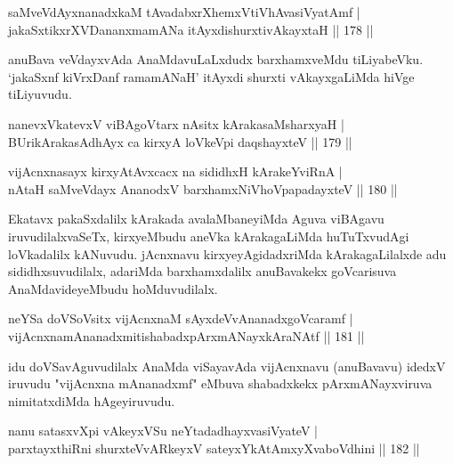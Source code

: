 \begin{shl}
saMveVdAyxnanadxkaM tAvadabxrXhemxVtiVhAvasiVyatAmf |\\
jakaSxtikxrXVDananxmamANa itAyxdishurxtivAkayxtaH \hfill || 178 ||
\end{shl}

\begin{artha}
anuBava veVdayxvAda AnaMdavuLaLxdudx barxhamxveMdu tiLiyabeVku. `jakaSxnf kiVrxDanf ramamANaH' itAyxdi shurxti vAkayxgaLiMda hiVge tiLiyuvudu.
\end{artha}


\begin{shl}
nanevxVkatevxV viBAgoV\s tarx nAsitx kArakasaMsharxyaH |\\
BUrikArakasAdhAyx ca kirxyA loVkeV\s pi daqshayxteV \hfill || 179 ||
\end{shl}

\begin{shl}
vijAcnxnasayx kirxyAtAvxcacx na sididhxH kArakeYviRnA |\\
nAtaH saMveVdayx AnanodxV barxhamxNiVhoVpapadayxteV \hfill || 180 ||
\end{shl}

\begin{artha}%
Ekatavx pakaSxdalilx kArakada avalaMbaneyiMda Aguva viBAgavu iruvudilalxvaSeTx, kirxyeMbudu aneVka kArakagaLiMda huTuTxvudAgi loVkadalilx kANuvudu. jAcnxnavu kirxyeyAgidadxriMda kArakagaLilalxde adu sididhxsuvudilalx, adariMda barxhamxdalilx anuBavakekx goVcarisuva AnaMdavideyeMbudu hoMduvudilalx.
\end{artha}


\begin{shl}
neYSa doVSoV\s sitx vijAcnxnaM sAyxdeVvA\s \s nanadxgoVcaramf |\\
vijAcnxnamAnanadxmitishabadxpArxmANayxkAraNAtf \hfill || 181 ||
\end{shl}

\begin{artha}
idu doVSavAguvudilalx AnaMda viSayavAda vijAcnxnavu (anuBavavu) idedxV iruvudu "vijAcnxna mAnanadxmf" eMbuva shabadxkekx pArxmANayxviruva nimitatxdiMda hAgeyiruvudu.
\end{artha}


\begin{shl}
nanu satasxvXpi vAkeyxVSu neYtadadhayxvasiVyateV |\\
parxtayxthiRni shurxteVvARkeyxV sateyxYkAtAmxyXvaboVdhini \hfill || 182 ||
\end{shl}

